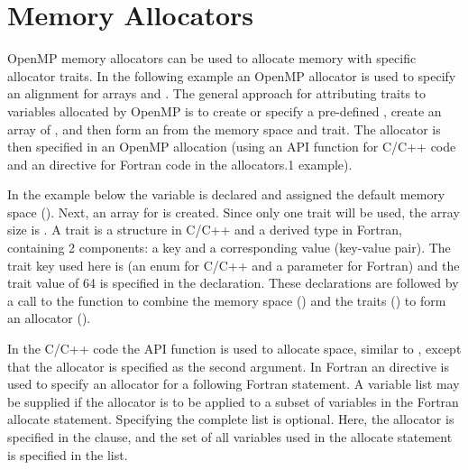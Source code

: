 \pagebreak
\section{ Memory Allocators}
\label{sec:allocators}

OpenMP memory allocators can be used to allocate memory with
specific allocator traits.  In the following example an OpenMP allocator is used to
specify an alignment for arrays  and . The
general approach for attributing traits to variables allocated by
OpenMP is to create or specify a pre-defined , create an
array of , and then form an  from the
memory space and trait.
The allocator is then specified
in an OpenMP allocation (using an API  function
for C/C++ code and an  directive for Fortran code
in the allocators.1 example).

In the example below the  variable is declared
and assigned the default memory space ().
Next, an array for  is created. Since only one
trait will be used, the array size is .
A trait is a structure in C/C++ and a derived type in Fortran,
containing 2 components: a key and a corresponding value (key-value pair).
The trait key used here is  (an enum for C/C++
and a parameter for Fortran)
and the trait value of 64 is specified in the  declaration.
These declarations are followed by a call to the
 function to combine the memory
space () and the traits ()
to form an allocator ().


In the C/C++ code the API   function is used
to allocate space, similar to , except that the allocator
is specified as the second argument.
In Fortran an  directive is used to specify an allocator
for a following Fortran  statement.
A variable list may be supplied if the allocator
is to be applied to a subset of variables in the Fortran allocate
statement. Specifying the complete list is optional.
Here, the  allocator is specified
in the  clause,
and the set of all variables used in the allocate statement is specified in the list.

